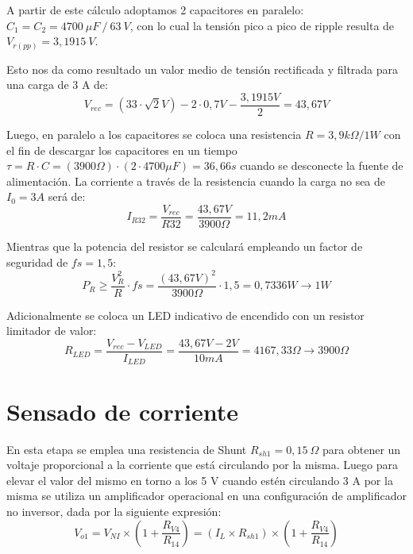 A partir de este cálculo adoptamos 2 capacitores en paralelo: $C_1 =C_2 =4700~\mu F~/~63~V$, con lo cual la tensión pico a pico de ripple resulta de  $V_{r(pp)} =3,1915~V$. \par 

Esto nos da como resultado un valor medio de tensión rectificada y filtrada para una carga de 3 A de: 
\begin{equation}
V_{rec} =(33\cdot \sqrt{2}V)-2\cdot 0,7V-\frac{3,1915V}{2}=43,67V
\end{equation} \par 

Luego, en paralelo a los capacitores se coloca una resistencia $R=3,9k\Omega /1W$ con el fin de descargar los capacitores en un tiempo $\tau =R\cdot C=(3900\Omega )\cdot (2\cdot 4700\mu F)=36,66s$ cuando se desconecte la fuente de alimentación. La corriente a través de la resistencia cuando la carga no sea de $I_0 =3A$ será de:
\begin{equation}
I_{R32} =\frac{V_{rec} }{R32}=\frac{43,67V}{3900\Omega }=11,2mA
\end{equation}\par 

Mientras que la potencia del resistor se calculará empleando un factor de seguridad de $fs=1,5$: 
\begin{equation}
P_R \ge \frac{V_R^2 }{R}\cdot fs=\frac{(43,67V)^2 }{3900\Omega }\cdot 1,5=0,7336W\to 1W
\end{equation} \par 

Adicionalmente se coloca un LED indicativo de encendido con un resistor limitador de valor: 
\begin{equation}
R_{LED} =\frac{V_{rec} -V_{LED} }{I_{LED} }=\frac{43,67V-2V}{10mA}=4167,33\Omega \to 3900\Omega
\end{equation} \par 

\section{Sensado de corriente}
En esta etapa se emplea una resistencia de Shunt $R_{sh1} =0,15~\Omega$ para obtener un voltaje proporcional a la corriente que está circulando por la misma. Luego para elevar el valor del mismo en torno a los 5 V cuando estén circulando 3 A por la misma se utiliza un amplificador operacional en una configuración de amplificador no inversor, dada por la siguiente expresión:
\begin{equation}
V_{o1} =V_{NI} \times (1+\frac{R_{V4} }{R_{14} })=(I_L \times R_{sh1} )\times (1+\frac{R_{V4} }{R_{14} })
\end{equation}\par 

